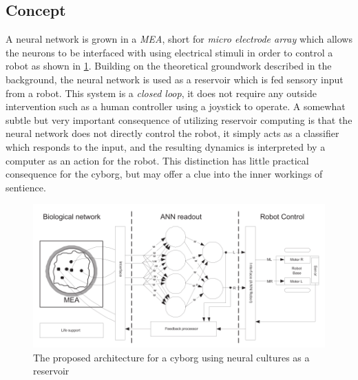 \subsection{Concept}
A neural network is grown in a \textit{MEA}, short for \textit{micro electrode
 array} which allows the neurons to be interfaced with using electrical stimuli
in order to control a robot as shown in \ref{fig:cyborg_idea}.
Building on the theoretical groundwork described in the background, the neural
network is used as a reservoir which is fed sensory input from a robot.
This system is a \textit{closed loop}, it does not require any outside
intervention such as a human controller using a joystick to operate.
A somewhat subtle but very important consequence of utilizing reservoir
computing is that the neural network does not directly control the robot, it
simply acts as a classifier which responds to the input, and the resulting
dynamics is interpreted by a computer as an action for the robot.
This distinction has little practical consequence for the cyborg, but may offer
a clue into the inner workings of sentience.
\begin{figure}[h!]
    \includegraphics[width=\linewidth]{images/cyborg_overview.png}
    \caption{The proposed architecture for a cyborg using neural cultures as a reservoir}
    \label{fig:cyborg_idea}
\end{figure}
